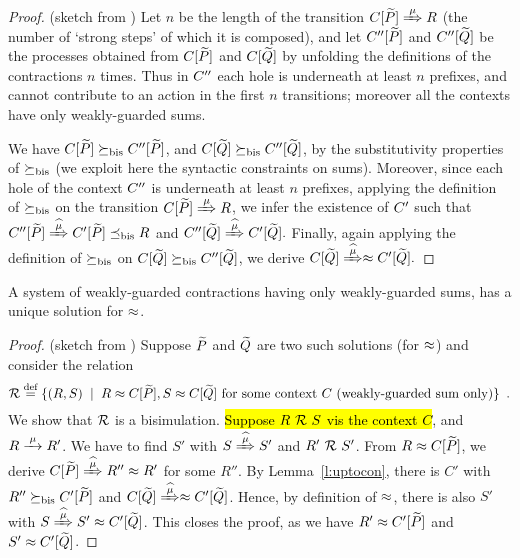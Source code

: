 \begin{proof}{(sketch from \cite{sangiorgi2017equations})}
Let $n$ be the length of the transition $\ct{\til P}\Arr\mu R$  (the
number of `strong steps' of which it is composed), and  
let $C'' [\widetilde P]$ and $C'' [\widetilde Q]$  be the processes obtained
from  $C [\widetilde P]$ and $C [\widetilde Q]$ by unfolding the definitions
of the contractions $n$ times. Thus in $C''$ each hole is
underneath at least $n$ prefixes, and cannot contribute to an action
in the first $n$ transitions; moreover all the contexts have only
weakly-guarded sums.

We have $C [\widetilde P] \mathrel{\succeq_{\rm{bis}}} C'' [\widetilde P]$, and 
$C [\widetilde Q] \mathrel{\succeq_{\rm{bis}}} C'' [\widetilde Q]$, 
 by the substitutivity  properties of $\mathrel{\succeq_{\rm{bis}}}$ (we exploit here
 the syntactic constraints on sums). Moreover,
 since each hole of the  context $C''$ is underneath at least $n$
 prefixes, applying  
the definition
 of $ \mathrel{\succeq_{\rm{bis}}}$ on the transition 
 $\ct{\til P}\Arr{\mu}  R$, we infer the existence
 of $C'$ such that 
$
\ctpp{\til P}\Arcap{\mu} \ctp{\til P} \mexpaBIS R
$
and 
$
\ctpp{\til Q}\Arcap{\mu}  \ctp{\til Q} 
. $
Finally, again applying the definition of $\mathrel{\succeq_{\rm{bis}}}$ on 
$C [\widetilde Q] \mathrel{\succeq_{\rm{bis}}} C'' [\widetilde Q]$, 
we derive 
$
\ct{\til Q}\Arcap{\mu}  \wb \ctp{\til Q} 
.$
\end{proof}

\begin{theorem}
\label{t:contraBisimulationU}
A system of weakly-guarded contractions
having only weakly-guarded sums, has a unique solution for $\approx$.
\end{theorem}

\begin{proof}{(sketch from \cite{sangiorgi2017equations})}
Suppose $\widetilde P$ and $\widetilde Q$ are two such solutions (for $\approx$) and consider
the relation
\begin{equation}
\label{eq:R}
{\cal R} \stackrel{\mbox{\scriptsize def}}{=} \{ 
(R,S) \; \mid \; R \approx C [\widetilde P], S \approx C [\widetilde Q] \mbox{ for some context
$C$ (weakly-guarded sum only)} \} \enspace.
\end{equation}
We show that ${\cal R}$ is a bisimulation. \hl{Suppose $R\ {\cal R}\ S$ vis the context
$C$}, and $R \arr{\mu} R'$. We have to find $S'$ with $S \Arcap{\mu}
S'$ and $R'\ {\cal R}\ S'$. From $R \approx C[{\widetilde P}]$, we derive $C[{\til P}]
\Arcap{\mu} R'' \wb R'$ for some $R''$. By Lemma~\ref{l:uptocon},
there is $C'$ with $R'' \mathrel{\succeq_{\rm{bis}}} C'[{\widetilde P}]$ and $C[{\til Q}]
\Arcap{\mu} \wb C'[{\til Q}]$. Hence, by definition of $\approx$, there is
also $S'$ with $S \Arcap{\mu} S' \wb C'[{\til Q}]$. This closes the
proof, as we have $R' \approx C'[{\widetilde P}]$ and $S' \approx C'[{\widetilde Q}]$.
\end{proof}

